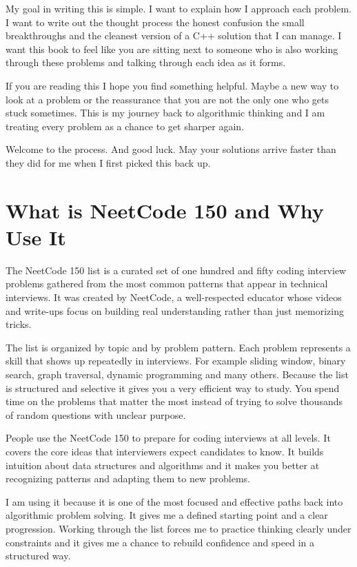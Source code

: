 \documentclass[12pt,letterpaper]{book}
\theoremstyle{definition}
\theoremstyle{remark}
\begin{document}
My goal in writing this is simple. I want to explain how I approach each problem. I want to write out the thought process the honest confusion the small breakthroughs and the cleanest version of a C++ solution that I can manage. I want this book to feel like you are sitting next to someone who is also working through these problems and talking through each idea as it forms.

If you are reading this I hope you find something helpful. Maybe a new way to look at a problem or the reassurance that you are not the only one who gets stuck sometimes. This is my journey back to algorithmic thinking and I am treating every problem as a chance to get sharper again.

Welcome to the process. And good luck. May your solutions arrive faster than they did for me when I first picked this back up.

\section*{What is NeetCode 150 and Why Use It}

The NeetCode 150 list is a curated set of one hundred and fifty coding interview problems gathered from the most common patterns that appear in technical interviews. It was created by NeetCode, a well-respected educator whose videos and write-ups focus on building real understanding rather than just memorizing tricks.

The list is organized by topic and by problem pattern. Each problem represents a skill that shows up repeatedly in interviews. For example sliding window, binary search, graph traversal, dynamic programming and many others. Because the list is structured and selective it gives you a very efficient way to study. You spend time on the problems that matter the most instead of trying to solve thousands of random questions with unclear purpose.

People use the NeetCode 150 to prepare for coding interviews at all levels. It covers the core ideas that interviewers expect candidates to know. It builds intuition about data structures and algorithms and it makes you better at recognizing patterns and adapting them to new problems.

I am using it because it is one of the most focused and effective paths back into algorithmic problem solving. It gives me a defined starting point and a clear progression. Working through the list forces me to practice thinking clearly under constraints and it gives me a chance to rebuild confidence and speed in a structured way.
\end{document}
